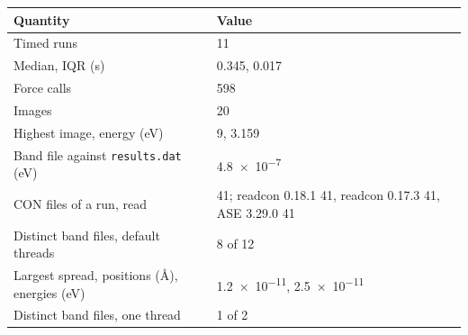 \begin{tabular}{@{}ll@{}}
\toprule
Quantity & Value\\
\midrule
Timed runs & 11\\
Median, IQR (s) & 0.345, 0.017\\
Force calls & 598\\
Images & 20\\
Highest image, energy (eV) & 9, 3.159\\
Band file against \texttt{results.dat} (eV) & \num{4.8e-7}\\
CON files of a run, read & 41; readcon 0.18.1 41, readcon 0.17.3 41, ASE 3.29.0 41\\
Distinct band files, default threads & 8 of 12\\
Largest spread, positions (\AA), energies (eV) & \num{1.2e-11}, \num{2.5e-11}\\
Distinct band files, one thread & 1 of 2\\
\bottomrule
\end{tabular}

